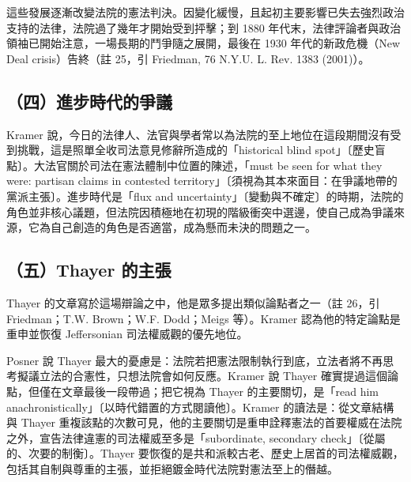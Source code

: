 這些發展逐漸改變法院的憲法判決。因變化緩慢，且起初主要影響已失去強烈政治支持的法律，法院過了幾年才開始受到抨擊；到 1880 年代末，法律評論者與政治領袖已開始注意，一場長期的鬥爭隨之展開，最後在 1930 年代的新政危機（New Deal crisis）告終（註 25，引 Friedman, 76 N.Y.U. L. Rev. 1383 (2001)）。

\subsection{（四）進步時代的爭議}

Kramer 說，今日的法律人、法官與學者常以為法院的至上地位在這段期間沒有受到挑戰，這是照單全收司法意見修辭所造成的「historical blind spot」〔歷史盲點〕。大法官關於司法在憲法體制中位置的陳述，「must be seen for what they were: partisan claims in contested territory」〔須視為其本來面目：在爭議地帶的黨派主張〕。進步時代是「flux and uncertainty」〔變動與不確定〕的時期，法院的角色並非核心議題，但法院因積極地在初現的階級衝突中選邊，使自己成為爭議來源，它為自己創造的角色是否適當，成為懸而未決的問題之一。

\subsection{（五）Thayer 的主張}

Thayer 的文章寫於這場辯論之中，他是眾多提出類似論點者之一（註 26，引 Friedman；T.W. Brown；W.F. Dodd；Meigs 等）。Kramer 認為他的特定論點是重申並恢復 Jeffersonian 司法權威觀的優先地位。

Posner 說 Thayer 最大的憂慮是：法院若把憲法限制執行到底，立法者將不再思考擬議立法的合憲性，只想法院會如何反應。Kramer 說 Thayer 確實提過這個論點，但僅在文章最後一段帶過；把它視為 Thayer 的主要關切，是「read him anachronistically」〔以時代錯置的方式閱讀他〕。Kramer 的讀法是：從文章結構與 Thayer 重複該點的次數可見，他的主要關切是重申詮釋憲法的首要權威在法院之外，宣告法律違憲的司法權威至多是「subordinate, secondary check」〔從屬的、次要的制衡〕。Thayer 要恢復的是共和派較古老、歷史上居首的司法權威觀，包括其自制與尊重的主張，並拒絕鍍金時代法院對憲法至上的僭越。

